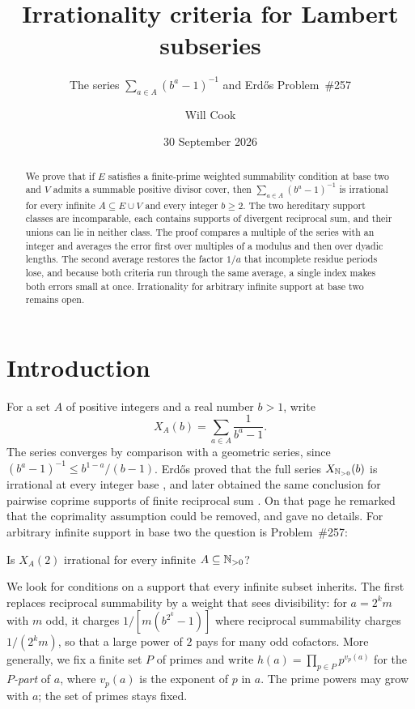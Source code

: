 \documentclass[11pt]{article}
\title{Irrationality criteria for Lambert subseries}
\subtitle{The series $\sum_{a\in A}(b^a-1)^{-1}$ and Erd\H{o}s Problem~\#257}
\author{Will Cook}
\date{30 September 2026}
\begin{document}
\maketitle
\noteprovenance
\begin{abstract}
We prove that if $E$ satisfies a finite-prime weighted summability
condition at base two and $V$ admits a summable positive divisor cover,
then $\sum_{a\in A}(b^a-1)^{-1}$ is irrational for every infinite
$A\subseteq E\cup V$ and every integer $b\ge2$. The two hereditary
support classes are incomparable, each contains supports of divergent
reciprocal sum, and their unions can lie in neither class. The proof
compares a multiple of the series with an integer and averages the
error first over multiples of a modulus and then over dyadic lengths.
The second average restores the factor $1/a$ that incomplete residue
periods lose, and because both criteria run through the same average,
a single index makes both errors small at once. Irrationality for
arbitrary infinite support at base two remains open.
\end{abstract}

\section{Introduction}\label{sec:problem}
For a set $A$ of positive integers and a real number $b>1$, write
\[
 X_A(b)=\sum_{a\in A}\frac1{b^a-1}.
\]
The series converges by comparison with a geometric series, since
$(b^a-1)^{-1}\le b^{1-a}/(b-1)$. Erd\H{o}s proved that the full
series $X_{\mathbb{N}_{>0}}(b)$ is irrational at every integer base
\cite{erdos1948}, and later obtained the same conclusion for pairwise
coprime supports of finite reciprocal sum \cite[p.~222]{erdos1968}.
On that page he remarked that the coprimality assumption could be
removed, and gave no details. For arbitrary infinite support in base
two the question is Problem~\#257:

\begin{problem}[Erd\H{o}s \#257]\label{res:problem}
Is $X_A(2)$ irrational for every infinite $A\subseteq\mathbb{N}_{>0}$?
\end{problem}

We look for conditions on a support that every infinite subset
inherits. The first replaces reciprocal summability by a weight that
sees divisibility: for $a=2^km$ with $m$ odd, it charges
$1/[m(b^{2^k}-1)]$ where reciprocal summability charges $1/(2^km)$, so
that a large power of $2$ pays for many odd cofactors. More generally,
we fix a finite set $P$ of primes and write
$h(a)=\prod_{p\in P}p^{v_p(a)}$ for the \emph{$P$-part} of $a$, where
$v_p(a)$ is the exponent of $p$ in $a$. The prime powers may grow with
$a$; the set of primes stays fixed.
\end{document}

